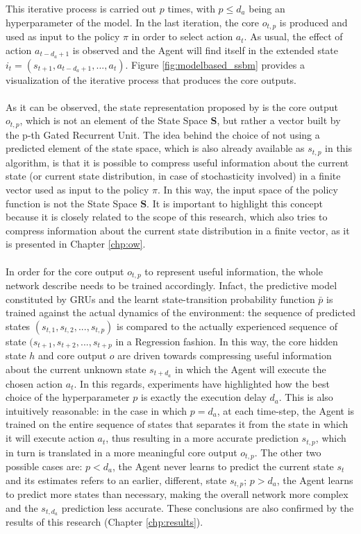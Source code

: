                 This iterative process is carried out $p$ times, with $p \leq d_a$ being an hyperparameter of the model. In the last iteration, the core $o_{t, p}$ is produced and used as input to the policy $\pi$ in order to select action $a_t$. As usual, the effect of action $a_{t-d_a+1}$ is observed and the Agent will find itself in the extended state $i_t = \left( s_{t+1}, a_{t-d_a+1},..., a_{t}\right)$. Figure \ref{fig:modelbased_ssbm} provides a visualization of the iterative process that produces the core outputs.
                \\\\
                As it can be observed, the state representation proposed by  is the core output $o_{t,p}$, which is not an element of the State Space $\mathbf{S}$, but rather a vector built by the p-th Gated Recurrent Unit. The idea behind the choice of not using a predicted element of the state space, which is also already available as $s_{t,p}$ in this algorithm, is that it is possible to compress useful information about the current state (or current state distribution, in case of stochasticity involved) in a finite vector used as input to the policy $\pi$. In this way, the input space of the policy function is not the State Space $\mathbf{S}$. \newline
                It is important to highlight this concept because it is closely related to the scope of this research, which also tries to compress information about the current state distribution in a finite vector, as it is presented in Chapter \ref{chp:ow}. 
                \\\\
                In order for the core output $o_{t,p}$ to represent useful information, the whole network describe needs to be trained accordingly. Infact, the predictive model constituted by GRUs and the learnt state-transition probability function $\bar{p}$ is trained against the actual dynamics of the environment: the sequence of predicted states $(s_{t, 1}, s_{t, 2}, ..., s_{t, p})$ is compared to the actually experienced sequence of state $(s_{t+1}, s_{t+2}, ..., s_{t+p}$ in a Regression fashion. In this way, the core hidden state $h$ and core output $o$ are driven towards compressing useful information about the current unknown state $s_{t+d_a}$ in which the Agent will execute the chosen action $a_t$. In this regards, experiments have highlighted how the best choice of the hyperparameter $p$ is exactly the execution delay $d_a$. This is also intuitively reasonable: in the case in which $p = d_a$, at each time-step, the Agent is trained on the entire sequence of states that separates it from the state in which it will execute action $a_t$, thus resulting in a more accurate prediction $s_{t, p}$, which in turn is translated in a more meaningful core output $o_{t, p}$. The other two possible cases are: $p < d_a$, the Agent never learns to predict the current state $s_t$ and its estimates refers to an earlier, different, state $s_{t,p}$; $p > d_a$, the Agent learns to predict more states than necessary, making the overall network more complex and the $s_{t, d_a}$ prediction less accurate. These conclusions are also confirmed by the results of this research (Chapter \ref{chp:results}).
                
